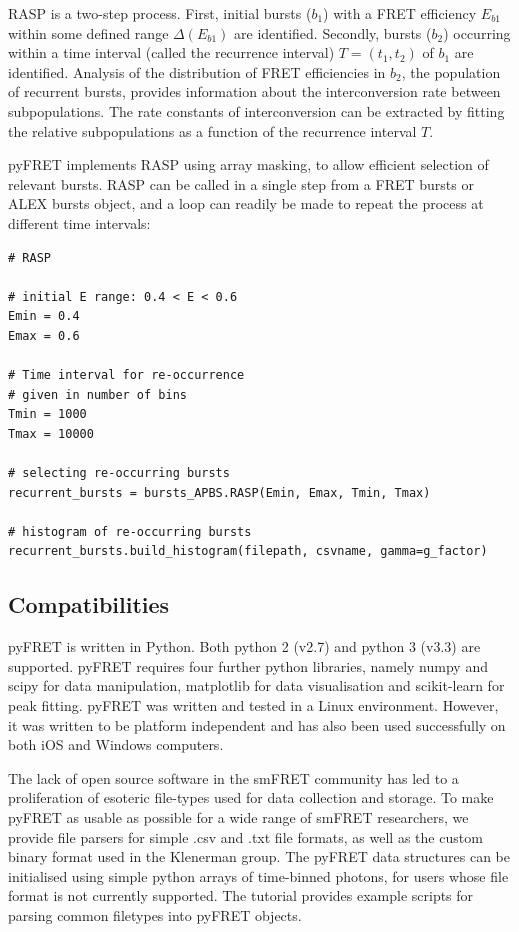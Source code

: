 RASP is a two-step process. First, initial bursts ($b_1$) with a FRET efficiency $E_{b1}$ within some defined range $\Delta(E_{b1})$ are identified. Secondly, bursts ($b_2$) occurring within a time interval (called the recurrence interval) $T = (t_1, t_2)$ of $b_1$ are identified. Analysis of the distribution of FRET efficiencies in $b_2$, the population of recurrent bursts, provides information about the interconversion rate between subpopulations. The rate constants of interconversion can be extracted by fitting the relative subpopulations as a function of the recurrence interval $T$.

pyFRET implements RASP using array masking, to allow efficient selection of relevant bursts. RASP can be called in a single step from a FRET bursts or ALEX bursts object, and a loop can readily be made to repeat the process at different time intervals:

\begin{lstlisting}
# RASP

# initial E range: 0.4 < E < 0.6
Emin = 0.4
Emax = 0.6

# Time interval for re-occurrence
# given in number of bins
Tmin = 1000
Tmax = 10000

# selecting re-occurring bursts
recurrent_bursts = bursts_APBS.RASP(Emin, Emax, Tmin, Tmax)

# histogram of re-occurring bursts
recurrent_bursts.build_histogram(filepath, csvname, gamma=g_factor)
\end{lstlisting} 

\subsection{Compatibilities}
pyFRET is written in Python. Both python 2 (v2.7) and python 3 (v3.3) are supported. pyFRET requires four further python libraries, namely numpy and scipy for data manipulation, matplotlib for data visualisation and scikit-learn for peak fitting.  pyFRET was written and tested in a Linux environment. However, it was written to be platform independent and has also been used successfully on both iOS and Windows computers.

The lack of open source software in the smFRET community has led to a proliferation of esoteric file-types used for data collection and storage. To make pyFRET as usable as possible for a wide range of smFRET researchers, we provide file parsers for simple .csv and .txt file formats, as well as the custom binary format used in the Klenerman group. The pyFRET data structures can be initialised using simple python arrays of time-binned photons, for users whose file format is not currently supported. The tutorial provides example scripts for parsing common filetypes into pyFRET objects.

